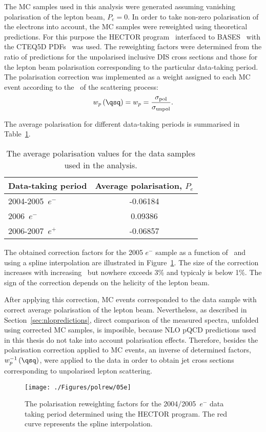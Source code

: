 \label{sec:polcor}
The MC samples used in this analysis were generated assuming vanishing polarisation of the lepton beam, $P_e = 0$. In order to take non-zero polarisation of the electrons into account, the MC samples were reweighted using theoretical predictions. For this purpose the HECTOR program~\cite{cpc:94:128} interfaced to BASES~\cite{upub:Nagano:url} with the CTEQ5D PDFs~\cite{pr:d51:4763} was used. The reweighting factors were determined from the ratio of predictions for the unpolarised inclusive DIS cross sections and those for the lepton beam polarisation corresponding to the particular data-taking period. The polarisation correction was implemented as a weight assigned to each MC event according to the \qsq~of the scattering process:
\begin{equation}
 w_p\left(\qsq\right) = w_p = \frac{\sigma_\mathrm{pol}}{\sigma_\mathrm{unpol}}.
\end{equation}

The average polarisation for different data-taking periods is summarised in Table~\ref{tab:polvalues}.
\begin{table}[h]
 \centering
 \begin{tabular}{lc}
 Data-taking period & Average polarisation, $P_e$ \\
\hline
 2004-2005~$e^-$   & -0.06184 \\
 2006~$e^-$   & 0.09386  \\
 2006-2007~$e^+$ & -0.06857
\end{tabular} 
\caption{The average polarisation values for the data samples used in the analysis.}
\label{tab:polvalues}
\end{table}
The obtained correction factors for the 2005 $e^-$ sample as a function of \qsq~and using a spline interpolation are illustrated in Figure~\ref{fig:polcor05e}. The size of the correction increases with increasing \qsq~but nowhere exceeds 3\% and typicaly is below 1\%. The sign of the correction depends on the helicity of the lepton beam.

After applying this correction, MC events corresponded to the data sample with correct average polarisation of the lepton beam. Nevertheless, as described in Section~\ref{sec:nlopredictions}, direct comparison of the measured spectra, unfolded using corrected MC samples, is imposible, because NLO pQCD predictions used in this thesis do not take into account polarisation effects. Therefore, besides the polarisation correction applied to MC events, an inverse of determined factors, $w_p^{-1}\left(\qsq\right)$, were applied to the data in order to obtain jet cross sections corresponding to unpolarised lepton scattering.

\begin{figure}[h]
 \begin{center}
 \texttt{[image: ./Figures/polrew/05e]}
\end{center}
\caption{The polarisation reweighting factors for the 2004/2005~$e^-$ data taking period determined using the HECTOR program. The red curve represents the spline interpolation.}
\label{fig:polcor05e}
\end{figure} 
